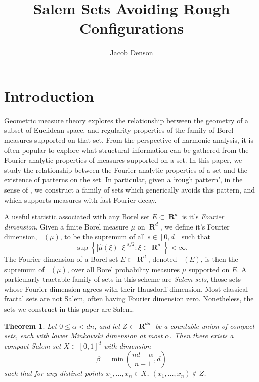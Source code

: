 \documentclass[12pt,reqno]{article}
\title{Salem Sets Avoiding Rough Configurations}
\author{Jacob Denson}
\numberwithin{equation}{section}
\DeclareMathOperator{\fordim}{\dim_{\mathbf{F}}}
\DeclareMathOperator{\RR}{\mathbf{R}}
\newtheorem{theorem}{Theorem}
\begin{document}
\maketitle

\section{Introduction}

Geometric measure theory explores the relationship between the geometry of a subset of Euclidean space, and regularity properties of the family of Borel measures supported on that set. From the perspective of harmonic analysis, it is often popular to explore what structural information can be gathered from the Fourier analytic properties of measures supported on a set. In this paper, we study the relationship between the Fourier analytic properties of a set and the existence of patterns on the set. In particular, given a `rough pattern', in the sense of \cite{OurPaper}, we construct a family of sets which generically avoids this pattern, and which supports measures with fast Fourier decay.

A useful statistic associated with any Borel set $E \subset \RR^d$ is it's \emph{Fourier dimension}. Given a finite Borel measure $\mu$ on $\RR^d$, we define it's Fourier dimension, $\fordim(\mu)$, to be the supremum of all $s \in [0,d]$ such that
%
\begin{equation} \label{fordim}
    \sup \left\{ |\widehat{\mu}(\xi)| |\xi|^{s/2} : \xi \in \RR^d \right\} < \infty.
\end{equation}
%
The Fourier dimension of a Borel set $E \subset \RR^d$, denoted $\fordim(E)$, is then the supremum of $\fordim(\mu)$, over all Borel probability measures $\mu$ supported on $E$. A particularly tractable family of sets in this scheme are \emph{Salem sets}, those sets whose Fourier dimension agrees with their Hausdorff dimension. Most classical fractal sets are not Salem, often having Fourier dimension zero. Nonetheless, the sets we construct in this paper are Salem.

\begin{theorem} \label{maintheorem}
    Let $0 \leq \alpha < dn$, and let $Z \subset \RR^{dn}$ be a countable union of compact sets, each with lower Minkowski dimension at most $\alpha$. Then there exists a compact Salem set $X \subset [0,1]^d$ with dimension
    \[ \beta = \min \left( \frac{nd - \alpha}{n-1}, d \right) \]
    such that for any distinct points $x_1, \dots, x_n \in X$, $(x_1, \dots, x_n) \not \in Z$.
\end{theorem}
\end{document}
